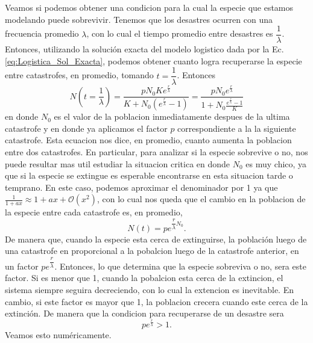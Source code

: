 Veamos si podemos obtener una condicion para la cual la especie que estamos modelando puede sobrevivir. Tenemos que los desastres ocurren con una frecuencia promedio $\lambda$, con lo cual el tiempo promedio entre desastres es $\dfrac{1}{\lambda}$. Entonces, utilizando la solución exacta del modelo logistico dada por la Ec. \ref{eq:Logistica_Sol_Exacta}, podemos obtener cuanto logra recuperarse la especie entre catastrofes, en promedio, tomando $t=\dfrac{1}{\lambda}$. Entonces
\begin{equation}
    N(t=\frac{1}{\lambda}) = \frac{pN_{0} K e^{\frac{r}{\lambda}}}{K+N_{0}(e^{\frac{r}{\lambda}}-1)} = \frac{pN_{0} e^{\frac{r}{\lambda}}}{1+N_{0}\frac{e^{\frac{r}{\lambda}}-1}{K}} 
\end{equation}
en donde $N_{0}$ es el valor de la poblacion inmediatamente despues de la ultima catastrofe y en donde ya aplicamos el factor $p$ correspondiente a la la siguiente catastrofe. Esta ecuacion nos dice, en promedio, cuanto aumenta la poblacion entre dos catastrofes. En particular, para analizar si la especie sobrevive o no, nos puede resultar mas util estudiar la situacion critica en donde $N_{0}$ es muy chico, ya que si la especie se extingue es esperable encontrarse en esta situacion tarde o temprano. En este caso, podemos aproximar el denominador por 1 ya que $\frac{1}{1+ax} \approx 1 + ax + \mathcal{O}(x^2)$, con lo cual nos queda que el cambio en la poblacion de la especie entre cada catastrofe es, en promedio,
\begin{equation}
    N(t) = pe^{\dfrac{r}{\lambda}N_{0}}.
\end{equation}
De manera que, cuando la especie esta cerca de extinguirse, la población luego de una catastrofe en proporcional a la pobalcion luego de la catastrofe anterior, en un factor $pe^{\dfrac{r}{\lambda}}$. Entonces, lo que determina que la especie sobreviva o no, sera este factor. Si es menor que 1, cuando la pobalcion esta cerca de la extincion, el sistema siempre seguira decreciendo, con lo cual la extencion es inevitable. En cambio, si este factor es mayor que 1, la poblacion crecera cuando este cerca de la extinción. De manera que la condicion para recuperarse de un desastre sera
\begin{equation}
    pe^{\frac{r}{\lambda}} > 1.
\end{equation}
Veamos esto numéricamente. 

